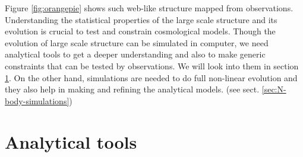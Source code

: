 \documentclass[12pt]{article}
\begin{document}
Figure \ref{fig:orangepie} shows such web-like structure mapped from observations.
Understanding the statistical properties of the large scale structure and its evolution is crucial to test and constrain cosmological models.
Though the evolution of large scale structure can be simulated in computer, we need analytical tools to get a deeper understanding and also to make generic constraints that can be tested by observations. We will look into them in section \ref{sec:anal-tools}. On the other hand, simulations are needed to do full non-linear evolution and they also help in making and refining the analytical models. (see sect. \ref{sec:N-body-simulations}) 


\section{Analytical tools}
\label{sec:anal-tools}
\end{document}
